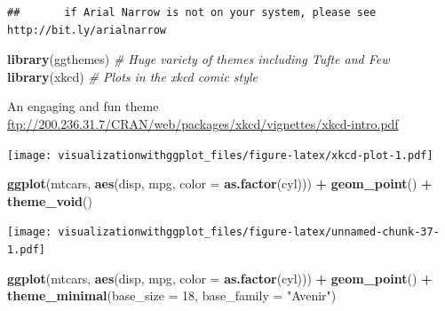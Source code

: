 \documentclass[]{krantz}
\makeatletter
\newenvironment{Shaded}{\begin{snugshade}}{\end{snugshade}}
\newcommand{\CommentTok}[1]{\textcolor[rgb]{0.56,0.35,0.01}{\textit{#1}}}
\newcommand{\DataTypeTok}[1]{\textcolor[rgb]{0.13,0.29,0.53}{#1}}
\newcommand{\DecValTok}[1]{\textcolor[rgb]{0.00,0.00,0.81}{#1}}
\newcommand{\KeywordTok}[1]{\textcolor[rgb]{0.13,0.29,0.53}{\textbf{#1}}}
\newcommand{\NormalTok}[1]{#1}
\newcommand{\OperatorTok}[1]{\textcolor[rgb]{0.81,0.36,0.00}{\textbf{#1}}}
\newcommand{\StringTok}[1]{\textcolor[rgb]{0.31,0.60,0.02}{#1}}
\newenvironment{kframe}{%
\medskip{}
\setlength{\fboxsep}{.8em}
 \def\at@end@of@kframe{}%
 \ifinner\ifhmode%
  \def\at@end@of@kframe{\end{minipage}}%
  \begin{minipage}{\columnwidth}%
 \fi\fi%
 \def\FrameCommand##1{\hskip\@totalleftmargin \hskip-\fboxsep
 \colorbox{shadecolor}{##1}\hskip-\fboxsep
     \hskip-\linewidth \hskip-\@totalleftmargin \hskip\columnwidth}%
 \MakeFramed {\advance\hsize-\width
   \@totalleftmargin\z@ \linewidth\hsize
   \@setminipage}}%
 {\par\unskip\endMakeFramed%
 \at@end@of@kframe}
\renewenvironment{Shaded}{\begin{kframe}}{\end{kframe}}
\makeatother
\begin{document}
\begin{verbatim}
##       if Arial Narrow is not on your system, please see http://bit.ly/arialnarrow
\end{verbatim}

\begin{Shaded}
\begin{Highlighting}[]
\KeywordTok{library}\NormalTok{(ggthemes) }\CommentTok{# Huge variety of themes including Tufte and Few}
\KeywordTok{library}\NormalTok{(xkcd) }\CommentTok{# Plots in the xkcd comic style}
\end{Highlighting}
\end{Shaded}

An engaging and fun theme
\url{ftp://200.236.31.7/CRAN/web/packages/xkcd/vignettes/xkcd-intro.pdf}

\texttt{[image: visualizationwithggplot\_files/figure-latex/xkcd-plot-1.pdf]}

\begin{Shaded}
\begin{Highlighting}[]
\KeywordTok{ggplot}\NormalTok{(mtcars, }\KeywordTok{aes}\NormalTok{(disp, mpg, }\DataTypeTok{color =} \KeywordTok{as.factor}\NormalTok{(cyl))) }\OperatorTok{+}\StringTok{ }
\StringTok{    }\KeywordTok{geom_point}\NormalTok{() }\OperatorTok{+}
\StringTok{    }\KeywordTok{theme_void}\NormalTok{()}
\end{Highlighting}
\end{Shaded}

\texttt{[image: visualizationwithggplot\_files/figure-latex/unnamed-chunk-37-1.pdf]}

\begin{Shaded}
\begin{Highlighting}[]
\KeywordTok{ggplot}\NormalTok{(mtcars, }\KeywordTok{aes}\NormalTok{(disp, mpg, }\DataTypeTok{color =} \KeywordTok{as.factor}\NormalTok{(cyl))) }\OperatorTok{+}\StringTok{ }
\StringTok{    }\KeywordTok{geom_point}\NormalTok{() }\OperatorTok{+}
\StringTok{  }\KeywordTok{theme_minimal}\NormalTok{(}\DataTypeTok{base_size =} \DecValTok{18}\NormalTok{, }\DataTypeTok{base_family =} \StringTok{"Avenir"}\NormalTok{)}
\end{Highlighting}
\end{Shaded}
\end{document}
